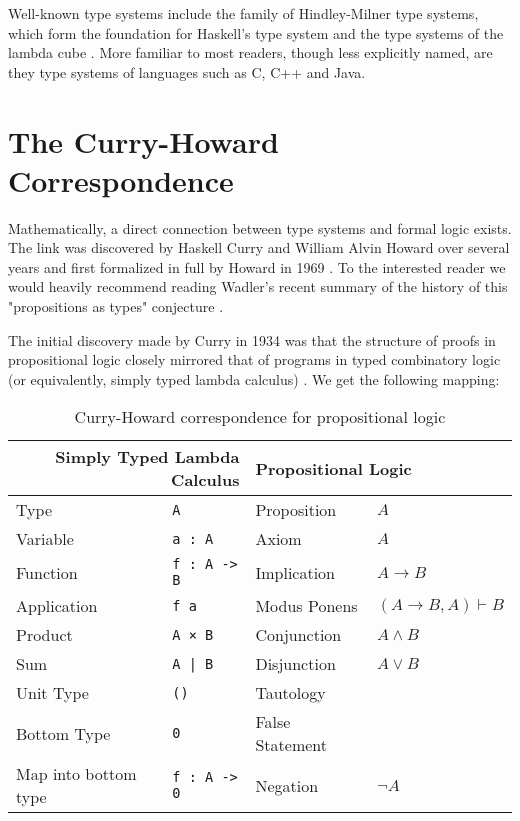 Well-known type systems include the family of Hindley-Milner type systems, which form the foundation for Haskell's type system \cite{haskelldesignreport} and the type systems of the lambda cube \cite{barendregt:1991:lambdacube}. More familiar to most readers, though less explicitly named, are they type systems of languages such as C, C++ and Java.

\section{The Curry-Howard Correspondence}
Mathematically, a direct connection between type systems and formal logic exists. The link was discovered by Haskell Curry and William Alvin Howard over several years and first formalized in full by Howard in 1969 \cite{howard1969formulaeastypes}. To the interested reader we would heavily recommend reading Wadler's recent summary of the history of this "propositions as types" conjecture \cite{wadler:2015:propositions}.

The initial discovery made by Curry in 1934 was that the structure of proofs in propositional logic closely mirrored that of programs in typed combinatory logic (or equivalently, simply typed lambda calculus) \cite{curry1934functionality}. We get the following mapping:

\begin{table}[H]
    \begin{center}
    \begin{tabular}{ll|ll}
                    \multicolumn{2}{r|}{\textbf{Simply Typed Lambda Calculus}}  & \multicolumn{2}{l}{\textbf{Propositional Logic}} \\ \hline
        Type        & \texttt{A}            & Proposition   & $A$ \\
        Variable    & \texttt{a : A}        & Axiom         & $A$ \\
        Function    & \texttt{f : A -> B}   & Implication   & $A \to B$ \\
        Application & \texttt{f a}          & Modus Ponens  & $(A \to B, A) \vdash B$ \\
        Product     & \texttt{A × B}        & Conjunction   & $A \land B$ \\
        Sum         & \texttt{A | B}        & Disjunction   & $A \lor B$ \\
        Unit Type   & \texttt{()}           & Tautology     & \\
        Bottom Type & \texttt{0}            & False Statement & \\
        Map into bottom type & \texttt{f : A -> 0}   & Negation       & $\lnot A$
    \end{tabular}
    \end{center}
\caption{Curry-Howard correspondence for propositional logic}
\label{tab:curryhowardprop}
\end{table}

